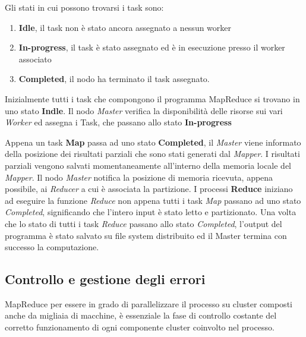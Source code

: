 \documentclass[LaM,binding=0.6cm]{sapthesis}
\begin{document}
Gli stati in cui possono trovarsi i task sono:
\begin{enumerate}
\item \textbf{Idle}, il task non è stato ancora assegnato a nessun worker
\item \textbf{In-progress}, il task è stato assegnato ed è in esecuzione presso il worker associato
\item \textbf{Completed}, il nodo ha terminato il task assegnato.
\end{enumerate}
Inizialmente tutti i task che compongono il programma MapReduce si trovano in uno stato \textbf{Indle}. Il nodo \textit{Master} verifica la disponibilità delle risorse sui vari \textit{Worker} ed assegna i Task, che passano allo stato \textbf{In-progress}

Appena un task \textbf{Map} passa ad uno stato \textbf{Completed}, il \textit{Master} viene informato della posizione dei risultati parziali che sono stati generati dal \textit{Mapper}. I risultati parziali vengono salvati momentaneamente all'interno della memoria locale del \textit{Mapper}. Il nodo \textit{Master} notifica la posizione di memoria ricevuta, appena possibile, ai \textit{Reducer} a cui è associata la partizione. 
I processi \textbf{Reduce} iniziano ad eseguire la funzione \textit{Reduce} non appena tutti i task \textit{Map} passano ad uno stato \textit{Completed}, significando che  l'intero input è stato letto e partizionato.
Una volta che lo stato di tutti i task \textit{Reduce} passano allo stato \textit{Completed}, l'output del programma è stato salvato su file system distribuito ed il Master termina con successo la computazione.

\subsection{Controllo e gestione degli errori}

MapReduce \cite{Dean:2008:MSD:1327452.1327492} per essere in grado di parallelizzare il processo su cluster composti anche da migliaia di macchine, è essenziale la fase di controllo costante del corretto funzionamento di ogni componente cluster coinvolto nel processo.
\end{document}

